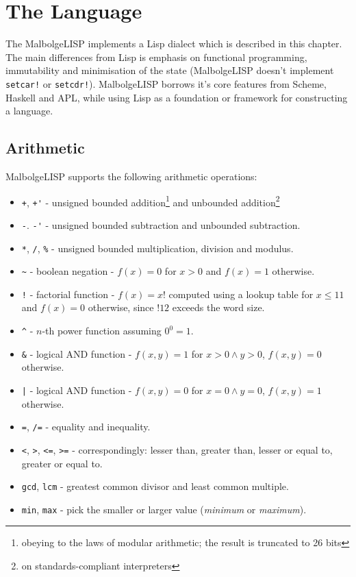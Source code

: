 
\chapter{The Language}

\par The MalbolgeLISP implements a Lisp dialect which is described in this chapter. The main differences from Lisp is emphasis on functional programming, immutability and minimisation of the state (MalbolgeLISP doesn't implement \verb|setcar!| or \verb|setcdr!|). MalbolgeLISP borrows it's core features from Scheme, Haskell and APL, while using Lisp as a foundation or framework for constructing a language.

\section{Arithmetic}

\par MalbolgeLISP supports the following arithmetic operations:

\begin{itemize}
    \item \verb|+|, \verb|+'| - unsigned bounded addition\footnote{obeying to the laws of modular arithmetic; the result is truncated to 26 bits} and unbounded addition\footnote{on standards-compliant interpreters}
    \item \verb|-|. \verb|-'| - unsigned bounded subtraction and unbounded subtraction.
    \item \verb|*|, \verb|/|, \verb|%| - unsigned bounded multiplication, division and modulus.
    \item \verb|~| - boolean negation - $f(x) = 0$ for $x > 0$ and $f(x) = 1$ otherwise.
    \item \verb|!| - factorial function - $f(x) = x!$ computed using a lookup table for $x \leq 11$ and $f(x) = 0$ otherwise, since $!12$ exceeds the word size.
    \item \verb|^| - $n$-th power function assuming $0^0=1$.
    \item \verb|&| - logical AND function - $f(x, y) = 1$ for $x > 0 \wedge y > 0$, $f(x, y) = 0$ otherwise.
    \item \verb=|= - logical AND function - $f(x, y) = 0$ for $x = 0 \wedge y = 0$, $f(x, y) = 1$ otherwise.
    \item \verb|=|, \verb|/=| - equality and inequality.
    \item \verb|<|, \verb|>|, \verb|<=|, \verb|>=| - correspondingly: lesser than, greater than, lesser or equal to, greater or equal to.
    \item \verb|gcd|, \verb|lcm| - greatest common divisor and least common multiple.
    \item \verb|min|, \verb|max| - pick the smaller or larger value (\textit{minimum} or \textit{maximum}).
\end{itemize}

